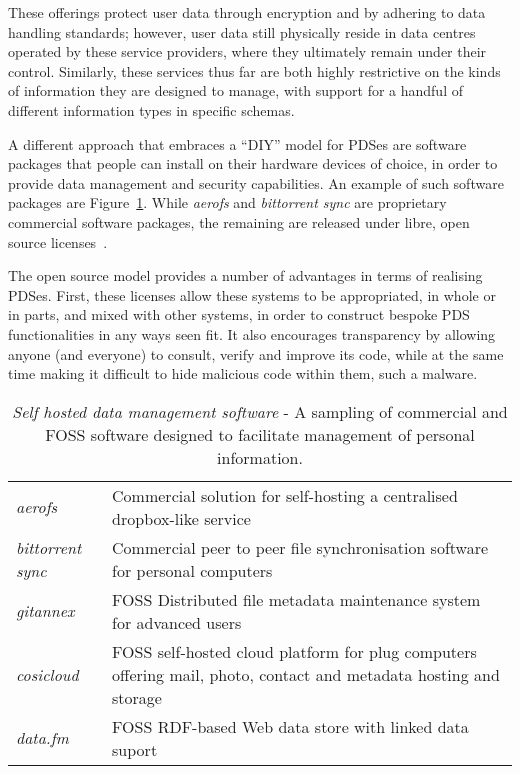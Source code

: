 \documentclass[graybox]{svmult}
\begin{document}
These offerings protect user data through encryption and by adhering to data handling standards; however, user data still physically reside in data centres operated by these service providers, where they ultimately remain under their control.  Similarly, these services thus far are both highly restrictive on the kinds of information they are designed to manage, with support for a handful of different information types in specific schemas.

A different approach that embraces a ``DIY” model \cite{purdue1997diy} for PDSes are software packages that people can install on their hardware devices of choice, in order to provide data management and security capabilities.  An example of such software packages are Figure~\ref{fig:selfhosted}.   While \emph{aerofs} and \emph{bittorrent sync} are proprietary commercial software packages, the remaining are released under libre, open source licenses~\cite{von2001learning}. 

The open source model provides a number of advantages in terms of realising PDSes.  First, these licenses allow these systems to be appropriated,  in whole or in parts, and mixed with other systems, in order to construct bespoke PDS functionalities in any ways seen fit.  It also encourages transparency by allowing anyone (and everyone) to consult, verify and improve its code, while at the same time making it difficult to hide malicious code within them, such a malware.  

\begin{table}
\begin{tabular}{l p{9cm}}
\emph{aerofs} & Commercial solution for self-hosting a centralised dropbox-like service \\
\emph{bittorrent sync} & Commercial peer to peer file synchronisation software for personal computers \\
\emph{gitannex} &  FOSS Distributed file metadata maintenance system for advanced users \\ 
\emph{cosicloud} & FOSS self-hosted cloud platform for plug computers offering mail, photo, contact and metadata hosting and storage \\
\emph{data.fm} & FOSS RDF-based Web data store with linked data suport
\end{tabular}
\caption{\emph{Self hosted data management software} - A sampling of commercial and FOSS software designed to facilitate management of personal information. }
\label{fig:selfhosted}
\end{table}
\end{document}
